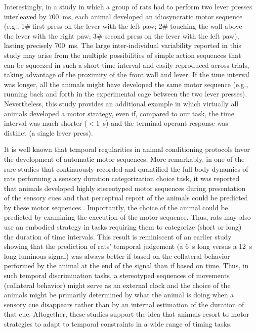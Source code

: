 Interestingly, in a study in which a group of rats had to perform two lever presses interleaved by 700~ms, each animal developed an idiosyncratic motor sequence (e.g., 1\# first press on the lever with the left paw; 2\# touching the wall above the lever with the right paw; 3\# second press on the lever with the left paw), lasting precisely 700~ms\cite{Kawai2015Neuron}.
The large inter-individual variability reported in this study may arise from the multiple possibilities of simple action sequences that can be squeezed in such a short time interval and easily reproduced across trials, taking advantage of the proximity of the front wall and lever.
If the time interval was longer, all the animals might have developed the same motor sequence (e.g., running back and forth in the experimental cage between the two lever presses).
Nevertheless, this study provides an additional example in which virtually all animals developed a motor strategy, even if, compared to our task, the time interval was much shorter ($< 1$~s) and the terminal operant response was distinct (a single lever press).
\par
It is well known that temporal regularities in animal conditioning protocols favor the development of automatic motor sequences.
More remarkably, in one of the rare studies that continuously recorded and quantified the full body dynamics of rats performing a sensory duration categorization choice task, it was reported that animals developed highly stereotyped motor sequences during presentation of the sensory cues and that perceptual report of the animals could be predicted by these motor sequences \cite{Gouvea2014FrontNeurorobotics}.
Importantly, the choice of the animal could be predicted by examining the execution of the motor sequence.
Thus, rats may also use an embodied strategy in tasks requiring them to categorize (short or long) the duration of time intervals.
This result is reminiscent of an earlier study showing that the prediction of rats' temporal judgement (a 6~s long versus a 12~s long luminous signal) was always better if based on the collateral behavior performed by the animal at the end of the signal than if based on time\cite{Fetterman1998}.
Thus, in such temporal discrimination tasks, a stereotyped sequences of movements (collateral behavior) might serve as an external clock and the choice of the animals might be primarily determined by what the animal is doing when a sensory cue disappears rather than by an internal estimation of the duration of that cue.
Altogether, these studies support the idea that animals resort to motor strategies to adapt to temporal constraints in a wide range of timing tasks.
